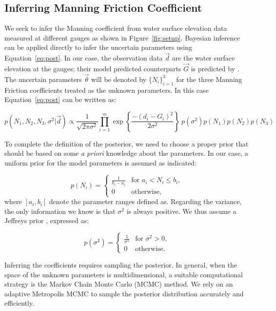 \subsection{Inferring Manning Friction Coefficient}
 \label{sec:manning}
 
We seek to infer the Manning coefficient from water surface elevation
data measured at different gauges as shown in Figure~\ref{fig:setup}.
Bayesian inference can be applied directly to infer the uncertain parameters
using Equation~\eqref{eq:post}. In our case, the observation data $\vec d$ 
are the water surface elevation at the gauges;
their model predicted counterparts $\vec G$ is predicted by \geoclaw.
The uncertain parameters $\vec \theta$ will be denoted by $\{N_i\}_{i=1}^3$ for the
three Manning Friction coefficients treated as the unknown parameters. 
In this case  Equation~\eqref{eq:post} can be written as:

\begin{equation} 
p(N_1,N_2,N_3,\sigma^2 | \vec d) 
\propto \frac{1}{\sqrt{2 \pi \sigma^2}} 
 \prod_{i=1}^m  
\exp \left\lbrace \frac{-(d_i - G_i)^2}{2 \sigma^2} \right\rbrace
\ p(\sigma^2)p(N_1)p(N_2) p(N_3)
\label{eq:post_coef}
\end{equation}

To complete the definition of the posterior, we need to choose a proper prior that should be based 
on some \emph{a priori} knowledge about the parameters. In our case, a uniform
prior for the model parameters is assumed as indicated:

\begin{equation} 
p(N_i) = \begin{cases}
		\displaystyle \frac{1}{b_i-a_i} &\text{for~} a_i <  N_i \leq b_i ,  \\
		0 &\text{otherwise}  , 
\end{cases}
\end{equation}
where $ [a_i,b_i]$ denote the parameter ranges defined as.
Regarding the variance, the only information we know 
is that $\sigma^2$ is always positive.
We thus assume a Jeffreys prior \citep{sivia}, expressed as:

\begin{equation} 
p(\sigma^2) =  \begin{cases}
		\displaystyle \frac{1}{\sigma^2} &\text{for~} \sigma^2 > 0,  \\
		0 &\text{otherwise}. 
		\end{cases}
\label{eq:var_pr}
\end{equation}

Inferring the coefficients requires 
sampling the posterior. In general, when the space of the unknown 
parameters is multidimensional, a suitable computational strategy is 
the Markov Chain Monte  Carlo (MCMC) method. 
We rely on an adaptive Metropolis MCMC \citep{Gareth2009,Haario2001} to
sample the posterior distribution accurately and efficiently.


